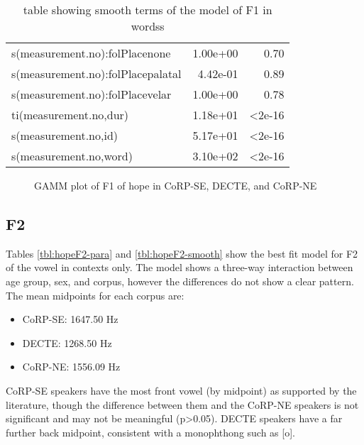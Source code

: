 \documentclass[../../../00.FullDoc/tex/Thesis]{subfiles}
\begin{document}
\begin{table}[htbp]
\begin{tabular}{lrr}
		s(measurement.no):folPlacenone & 1.00e+00 & 0.70 \\
		s(measurement.no):folPlacepalatal & 4.42e-01 & 0.89 \\
		s(measurement.no):folPlacevelar & 1.00e+00 & 0.78 \\
		ti(measurement.no,dur) & 1.18e+01 & <2e-16 \\
		s(measurement.no,id) & 5.17e+01 & <2e-16 \\
		s(measurement.no,word) & 3.10e+02 & <2e-16 \\
		\hline
	\end{tabular}
	\caption{table showing smooth terms of the model of F1 in \hope{} wordss}
	\label{tbl:hopeF1-smooth}
\end{table}

\begin{figure}[h]
	
	\caption{GAMM plot of F1 of hope in CoRP-SE, DECTE, and CoRP-NE} \label{fig:hopeF1}
\end{figure}


\subsection{\hope{} F2} \label{subsec:hopeF2}
Tables \ref{tbl:hopeF2-para} and \ref{tbl:hopeF2-smooth} show the best fit model for F2 of the \goat{} vowel in \hope{} contexts only. The model shows a three-way interaction between age group, sex, and corpus, however the differences do not show a clear pattern. The mean midpoints for each corpus are:
\begin{itemize}
	\item CoRP-SE: 1647.50 Hz
	\item DECTE: 1268.50 Hz
	\item CoRP-NE: 1556.09 Hz
\end{itemize}
CoRP-SE speakers have the most front vowel (by midpoint) as supported by the literature, though the difference between them and the CoRP-NE speakers is not significant and may not be meaningful (p>0.05). DECTE speakers have a far further back midpoint, consistent with a monophthong such as [o].
\end{document}
